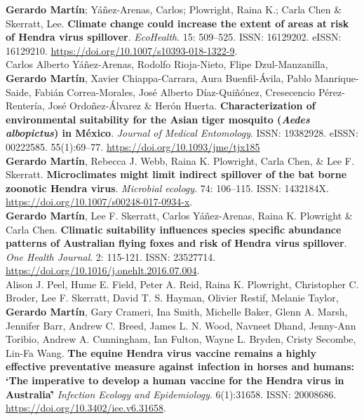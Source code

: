 \documentclass[11pt, letter]{article}
\newcommand{\years}[1]{\marginnote{\scriptsize #1}}
\begin{document}
\years{2018} \textbf{Gerardo Mart\'in}; Y\'a\~nez-Arenas, Carlos; Plowright, Raina K.; Carla Chen \& Skerratt, Lee. \textbf{Climate change could increase the extent of areas at risk of Hendra virus spillover}. \emph{EcoHealth}. 15: 509–525. ISSN: 16129202. eISSN: 16129210. \url{https://doi.org/10.1007/s10393-018-1322-9}.\\

\years{2017} Carlos Alberto Y\'a\~nez-Arenas, Rodolfo Rioja-Nieto, Flipe Dzul-Manzanilla, \textbf{Gerardo Mart\'in}, Xavier Chiappa-Carrara, Aura Buenfil-\'Avila, Pablo Manrique-Saide, Fabi\'an Correa-Morales, Jos\'e Alberto D\'iaz-Qui\~n\'onez, Cresecencio P\'erez-Renter\'ia, Jos\'e Ordo\~nez-\'Alvarez \& Her\'on Huerta. \textbf{Characterization of environmental suitability for the Asian tiger mosquito (\emph{Aedes albopictus}) in M\'exico}. \emph{Journal of Medical Entomology}. ISSN: 19382928. eISSN: 00222585. 55(1):69–77. \url{https://doi.org/10.1093/jme/tjx185}\\

\years{2017} \textbf{Gerardo Mart\'in}, Rebecca J. Webb, Raina K. Plowright, Carla Chen, \& Lee F. Skerratt. \textbf{Microclimates might limit indirect spillover of the bat borne zoonotic Hendra virus}. \emph{Microbial ecology}. 74: 106–115. ISSN: 1432184X. \url{https://doi.org/10.1007/s00248-017-0934-x}.\\

\years{2016} \textbf{Gerardo Mart\'in}, Lee F. Skerratt, Carlos Y\'a\~nez-Arenas, Raina K. Plowright \& Carla Chen. \textbf{Climatic suitability influences species specific abundance patterns of Australian flying foxes and risk of Hendra virus spillover}. \emph{One Health Journal}. 2: 115-121. ISSN: 23527714. \url{https://doi.org/10.1016/j.onehlt.2016.07.004}.\\

\years{2016} Alison J. Peel, Hume E. Field, Peter A. Reid, Raina K. Plowright, Christopher C. Broder, Lee F. Skerratt, David T. S. Hayman, Olivier Restif, Melanie Taylor, \textbf{Gerardo Mart\'in}, Gary Crameri, Ina Smith, Michelle Baker, Glenn A. Marsh, Jennifer Barr, Andrew C. Breed, James L. N. Wood, Navneet Dhand, Jenny-Ann Toribio, Andrew A. Cunningham, Ian Fulton, Wayne L. Bryden, Cristy Secombe, Lin-Fa Wang. \textbf{The equine Hendra virus vaccine remains a highly effective preventative measure against infection in horses and humans: \lq The imperative to develop a human vaccine for the Hendra virus in Australia\rq\.} \emph{Infection Ecology and Epidemiology}. 6(1):31658. ISSN: 20008686. \url{https://doi.org/10.3402/iee.v6.31658}.\\
\end{document}
